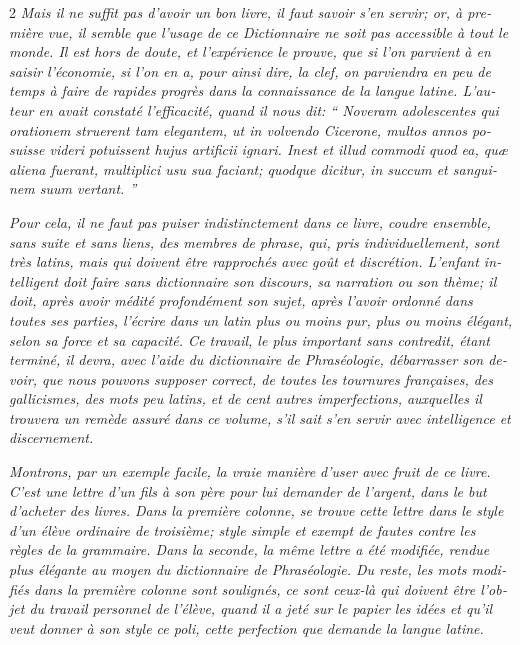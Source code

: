 \begin{otherlanguage}{french}
\begin{multicols}{2}
\textit{Mais il ne suffit pas d’avoir un bon livre, il faut savoir s’en servir; or, à première vue, il semble que l’usage de ce Dictionnaire ne soit pas accessible à tout le monde. Il est hors de doute, et l’expérience le prouve, que si l’on parvient à en saisir l’économie, si l’on en a, pour ainsi dire, la clef, on parviendra en peu de temps à faire de rapides progrès dans la connaissance de la langue latine. L’auteur en avait constaté l’efficacité, quand il nous dit: “ Noveram adolescentes qui orationem struerent tam elegantem, ut in volvendo Cicerone, multos annos posuisse videri potuissent hujus artificii ignari. Inest et illud commodi quod ea, quæ aliena fuerant, multiplici usu sua faciant; quodque dicitur, in succum et sanguinem suum vertant. ”}

\textit{Pour cela, il ne faut pas puiser indistinctement dans ce livre, coudre ensemble, sans suite et sans liens, des membres de phrase, qui, pris individuellement, sont très latins, mais qui doivent être rapprochés avec goût et discrétion. L’enfant intelligent doit faire sans dictionnaire son discours, sa narration ou son thème; il doit, après avoir médité profondément son sujet, après l’avoir ordonné dans toutes ses parties, l’écrire dans un latin plus ou moins pur, plus ou moins élégant, selon sa force et sa capacité. Ce travail, le plus important sans contredit, étant terminé, il devra, avec l’aide du dictionnaire de Phraséologie, débarrasser son devoir, que nous pouvons supposer correct, de toutes les tournures françaises, des gallicismes, des mots peu latins, et de cent autres imperfections, auxquelles il trouvera un remède assuré dans ce volume, s’il sait s’en servir avec intelligence et discernement.}

\textit{Montrons, par un exemple facile, la vraie manière d’user avec fruit de ce livre. C’est une lettre d’un fils à son père pour lui demander de l’argent, dans le but d’acheter des livres. Dans la première colonne, se trouve cette lettre dans le style d’un élève ordinaire de troisième; style simple et exempt de fautes contre les règles de la grammaire. Dans la seconde, la même lettre a été modifiée, rendue plus élégante au moyen du dictionnaire de Phraséologie. Du reste, les mots modifiés dans la première colonne sont soulignés, ce sont ceux-là qui doivent être l’objet du travail personnel de l’élève, quand il a jeté sur le papier les idées et qu’il veut donner à son style ce poli, cette perfection que demande la langue latine.}


\end{multicols}
\end{otherlanguage}
